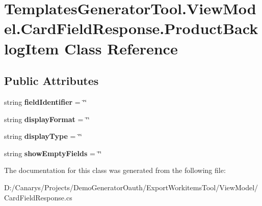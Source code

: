 \hypertarget{class_templates_generator_tool_1_1_view_model_1_1_card_field_response_1_1_product_backlog_item}{}\section{Templates\+Generator\+Tool.\+View\+Model.\+Card\+Field\+Response.\+Product\+Backlog\+Item Class Reference}
\label{class_templates_generator_tool_1_1_view_model_1_1_card_field_response_1_1_product_backlog_item}
\subsection*{Public Attributes}
\begin{DoxyCompactItemize}
\item 
\mbox{\label{class_templates_generator_tool_1_1_view_model_1_1_card_field_response_1_1_product_backlog_item_a4e38df031210c34a252dfea874f11720}} 
string {\bfseries field\+Identifier} = \char`\"{}\char`\"{}
\item 
\mbox{\label{class_templates_generator_tool_1_1_view_model_1_1_card_field_response_1_1_product_backlog_item_ab30dd3134567c775ac27cc74771440c6}} 
string {\bfseries display\+Format} = \char`\"{}\char`\"{}
\item 
\mbox{\label{class_templates_generator_tool_1_1_view_model_1_1_card_field_response_1_1_product_backlog_item_ab290cc9937b015d620fb52e34422ddd0}} 
string {\bfseries display\+Type} = \char`\"{}\char`\"{}
\item 
\mbox{\label{class_templates_generator_tool_1_1_view_model_1_1_card_field_response_1_1_product_backlog_item_a8569b229203bbf88e3e81accd6d6e946}} 
string {\bfseries show\+Empty\+Fields} = \char`\"{}\char`\"{}
\end{DoxyCompactItemize}


The documentation for this class was generated from the following file\+:\begin{DoxyCompactItemize}
\item 
D\+:/\+Canarys/\+Projects/\+Demo\+Generator\+Oauth/\+Export\+Workitems\+Tool/\+View\+Model/Card\+Field\+Response.\+cs\end{DoxyCompactItemize}
